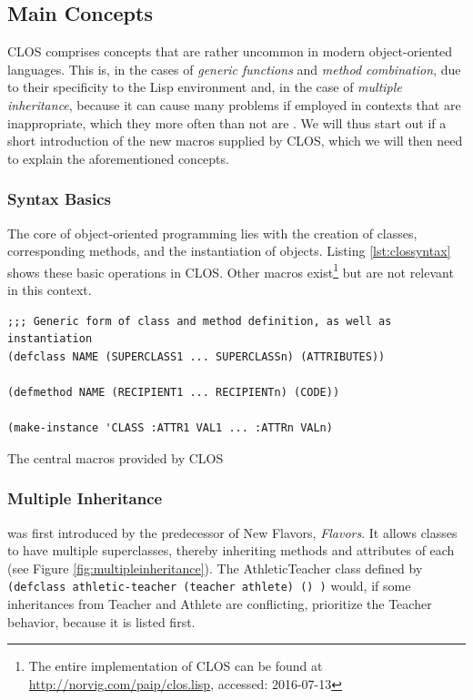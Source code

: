 \documentclass[oribibl]{llncs}
\begin{document}
\subsection{Main Concepts}
\label{sec:concepts}

CLOS comprises concepts that are rather uncommon in modern object-oriented languages. This is, in the cases of \emph{generic functions} and \emph{method combination}, due to their specificity to the Lisp environment and, in the case of \emph{multiple inheritance}, because it can cause many problems if employed in contexts that are inappropriate, which they more often than not are \cite{cargill1993case}. We will thus start out if a short introduction of the new macros supplied by CLOS, which we will then need to explain the aforementioned concepts.


\subsubsection{Syntax Basics}
The core of object-oriented programming lies with the creation of classes, corresponding methods, and the instantiation of objects. Listing \ref{lst:clossyntax} shows these basic operations in CLOS. Other macros exist\footnote{The entire implementation of CLOS can be found at \url{http://norvig.com/paip/clos.lisp}, accessed: 2016-07-13} but are not relevant in this context.

\begin{listing}[]%
\begin{verbatim}
;;; Generic form of class and method definition, as well as instantiation
(defclass NAME (SUPERCLASS1 ... SUPERCLASSn) (ATTRIBUTES))

(defmethod NAME (RECIPIENT1 ... RECIPIENTn) (CODE))

(make-instance 'CLASS :ATTR1 VAL1 ... :ATTRn VALn)
\end{verbatim}
\caption{The central macros provided by CLOS}
\label{lst:clossyntax}
\end{listing}


\subsubsection{Multiple Inheritance}
\label{sec:mulinh}
was first introduced by the predecessor of New Flavors, \emph{Flavors}. It allows classes to have multiple superclasses, thereby inheriting methods and attributes of each (see Figure \ref{fig:multipleinheritance}). The AthleticTeacher class defined by \texttt{(defclass athletic-teacher (teacher athlete) () )} would, if some inheritances from Teacher and Athlete are conflicting, prioritize the Teacher behavior, because it is listed first.  
\end{document}
